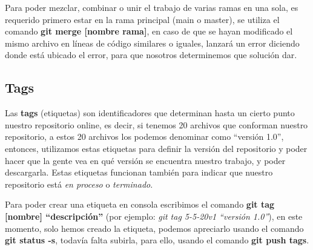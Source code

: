 Para poder mezclar, combinar o unir el trabajo de varias ramas en una sola, es requerido primero estar en la rama principal (main o master), se utiliza el comando \textbf{git merge [nombre rama]}, en caso de que se hayan modificado el mismo archivo en líneas de código similares o iguales, lanzará un error diciendo donde está ubicado el error, para que nosotros determinemos que solución dar.


\subsection{Tags}
\hspace{0.55cm}Las \textbf{tags} (etiquetas) son identificadores que determinan hasta un cierto punto nuestro repositorio online, es decir, si tenemos 20 archivos que conforman nuestro repositorio, a estos 20 archivos los podemos denominar como “versión 1.0”, entonces, utilizamos estas etiquetas para definir la versión del repositorio y poder hacer que la gente vea en qué versión se encuentra nuestro trabajo, y poder descargarla. Estas etiquetas funcionan también para indicar que nuestro repositorio está \textit{en proceso} o \textit{terminado}.

Para poder crear una etiqueta en consola escribimos el comando \textbf{git tag [nombre] “descripción”} (por ejemplo: \textit{git tag 5-5-20v1 “versión 1.0”}), en este momento, solo hemos creado la etiqueta, podemos apreciarlo usando el comando \textbf{git status -s}, todavía falta subirla, para ello, usando el comando \textbf{git push tags}.




